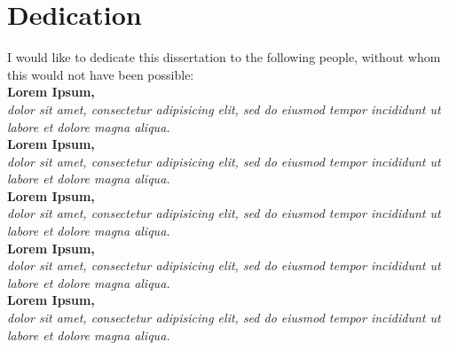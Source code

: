 \section*{Dedication}
I would like to dedicate this dissertation to the following people, without whom this would not have been possible:\\[2cm]
\newcommand{\dedicate}[2]{\textbf{#1,}\\\indent \textit{#2}\\[0.5cm]}
\dedicate{Lorem Ipsum}{dolor sit amet, consectetur adipisicing elit, sed do eiusmod tempor incididunt ut labore et dolore magna aliqua.}
\dedicate{Lorem Ipsum}{dolor sit amet, consectetur adipisicing elit, sed do eiusmod tempor incididunt ut labore et dolore magna aliqua.}
\dedicate{Lorem Ipsum}{dolor sit amet, consectetur adipisicing elit, sed do eiusmod tempor incididunt ut labore et dolore magna aliqua.}
\dedicate{Lorem Ipsum}{dolor sit amet, consectetur adipisicing elit, sed do eiusmod tempor incididunt ut labore et dolore magna aliqua.}
\dedicate{Lorem Ipsum}{dolor sit amet, consectetur adipisicing elit, sed do eiusmod tempor incididunt ut labore et dolore magna aliqua.}